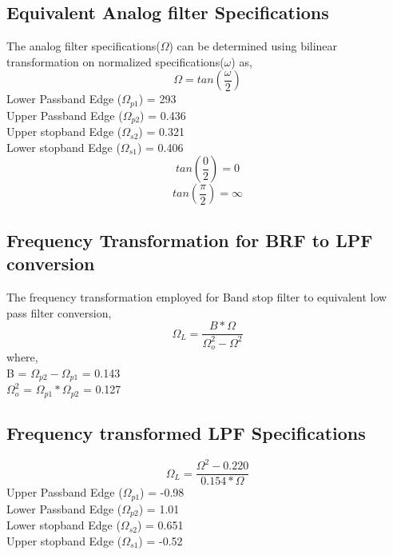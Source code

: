 \documentclass[12pt]{article}
\begin{document}
\subsection{Equivalent Analog filter Specifications}
The analog filter specifications($\Omega$) can be determined using bilinear transformation on normalized specifications($\omega$) as,
\begin{equation}
    \Omega = tan(\frac{\omega}{2})
\end{equation}
Lower Passband Edge ($\Omega_{p1}$) = 293\\
Upper Passband Edge ($\Omega_{p2}$) = 0.436\\
Upper stopband Edge ($\Omega_{s2}$) = 0.321\\
Lower stopband Edge ($\Omega_{s1}$) = 0.406\\
\begin{equation}
    tan(\frac{0}{2}) = 0
\end{equation}
\begin{equation}
    tan(\frac{\pi}{2}) = \infty
\end{equation}
\subsection{Frequency Transformation for BRF to LPF conversion}
The frequency transformation employed for Band stop filter to equivalent low pass filter conversion,
\begin{equation}
    \Omega_L = \frac{B*\Omega}{\Omega_o^2-\Omega^2}
\end{equation}
where,\\ 
B = $\Omega_{p2}-\Omega_{p1}$ = 0.143\\
$\Omega_o^2$ = $\Omega_{p1}*\Omega_{p2}$ = 0.127\\

\subsection{Frequency transformed LPF Specifications}
\begin{equation}
    \Omega_L = \frac{\Omega^2-0.220}{0.154*\Omega}
\end{equation}
Upper Passband Edge ($\Omega_{p1}$) = -0.98\\
Lower Passband Edge ($\Omega_{p2}$) = 1.01\\
Lower stopband Edge ($\Omega_{s2}$) = 0.651\\
Upper stopband Edge ($\Omega_{s1}$) = -0.52\\
\end{document}
